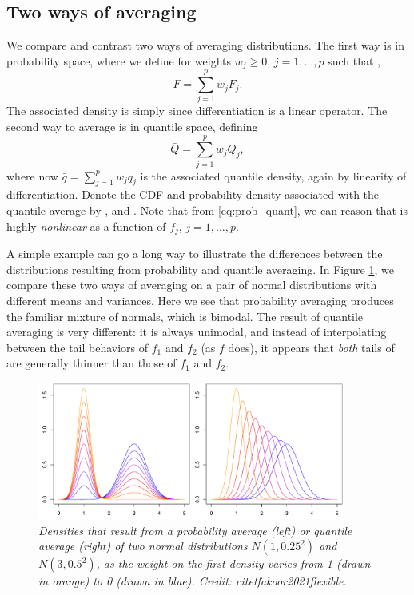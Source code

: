 \documentclass{article}
\begin{document}
\subsection{Two ways of averaging}

We compare and contrast two ways of averaging distributions. The first way is in
probability space, where we define for weights $w_j \geq 0$, $j=1,\dots,p$ such
that , 
\[
F = \sum_{j=1}^p w_j F_j.
\]
The associated density is simply  since
differentiation is a linear operator. The second way to average is in quantile
space, defining 
\[ 
\bar{Q} = \sum_{j=1}^p w_j Q_j,
\]
where now $\bar{q} = \sum_{j=1}^p w_j q_j$ is the associated quantile density,
again by linearity of differentiation. Denote the CDF and probability density
associated with the quantile average by , and
. Note that from \eqref{eq:prob_quant}, we can
reason that  is highly \emph{nonlinear} as a function of $f_j$, 
$j=1,\dots,p$.

A simple example can go a long way to illustrate the differences between the
distributions resulting from probability and quantile averaging. In Figure
\ref{fig:prob_quant}, we compare these two ways of averaging on a pair of
normal distributions with different means and variances.  Here we see that
probability averaging produces the familiar mixture of normals, which is
bimodal. The result of quantile averaging is very different: it is always
unimodal, and instead of interpolating between the tail behaviors of $f_1$ and
$f_2$ (as $f$ does), it appears that \emph{both} tails of  are 
generally thinner than those of $f_1$ and $f_2$.

\begin{figure}[htb]
\centering
\includegraphics[width=0.9\textwidth]{prob_quant.pdf} 
\caption{\it Densities that result from a probability average (left) or quantile
  average (right) of two normal distributions $N(1,0.25^2)$ and $N(3, 0.5^2)$,
  as the weight on the first density varies from 1 (drawn in orange) to 0
  (drawn in blue). Credit: citet{fakoor2021flexible}.}  
\label{fig:prob_quant}
\end{figure}
\end{document}
